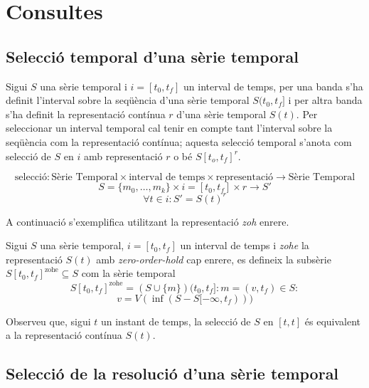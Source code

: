 {\section{Consultes}

\subsection{Selecció temporal d'una sèrie temporal}

Sigui $S$ una sèrie temporal i $i=[t_0,t_f]$ un interval de temps,
per una banda s'ha definit l'interval sobre la seqüència d'una sèrie temporal $S(t_0,t_f]$  i per altra banda s'ha definit la representació contínua $r$ d'una sèrie temporal $S(t)$. Per seleccionar un interval temporal cal tenir en compte tant l'interval sobre la seqüència com la representació contínua; aquesta selecció temporal s'anota com selecció de $S$ en $i$ amb representació $r$ o bé $S[t_o,t_f]^r$. 

\begin{definition}
  \[
  \text{selecció}: \text{Sèrie Temporal} \times \text{interval de
    temps} \times \text{representació} \longrightarrow \text{Sèrie
    Temporal}
  \]
  \[
  S = \{m_0 , \ldots , m_k\}  \times i = [t_0,t_f] \times r \longrightarrow S'
  \]
  \[
  \forall  t \in i: S' = S(t)^r 
  \] 
\end{definition}

A continuació s'exemplifica utilitzant la representació \emph{zoh} enrere.


\begin{definition}
  Sigui $S$ una sèrie temporal, $i=[t_0,t_f]$ un interval de temps i
  \emph{zohe} la representació $S(t)$ amb \emph{zero-order-hold} cap
  enrere, es defineix la subsèrie $S[t_0,t_f]^{\text{zohe}}\subseteq
  S$ com la sèrie temporal 
  \[
  S[t_0,t_f]^{\text{zohe}} = (S \cup \{m\})(t_0,t_f] : m=(v,t_f) \in S:
  \]
  \[
  v=  V(\inf(S-S[-\infty,t_f)))
  \]
\end{definition}

Observeu que, sigui $t$ un instant de temps, la selecció de $S$ en $[t,t]$ és equivalent a la representació contínua $S(t)$. 



\subsection{Selecció de la resolució d'una sèrie temporal}

}
